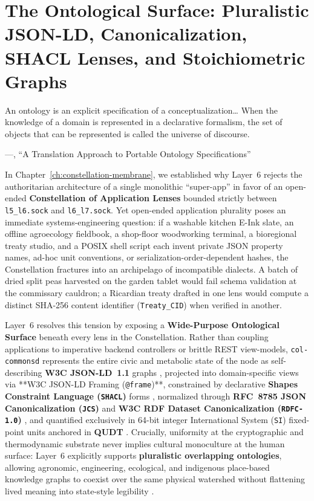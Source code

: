 \chapter{The Ontological Surface: Pluralistic JSON-LD, Canonicalization, SHACL Lenses, and Stoichiometric Graphs}
\label{ch:semantic-foundation}

\epigraph{An ontology is an explicit specification of a conceptualization\ldots{} When the knowledge of a domain is represented in a declarative formalism, the set of objects that can be represented is called the universe of discourse.}{---\textcite{gruber1993ontology}, ``A Translation Approach to Portable Ontology Specifications''}

In Chapter~\ref{ch:constellation-membrane}, we established why Layer~6 rejects the authoritarian architecture of a single monolithic ``super-app'' in favor of an open-ended \textbf{Constellation of Application Lenses} bounded strictly between \texttt{l5\_l6.sock} and \texttt{l6\_l7.sock}. Yet open-ended application plurality poses an immediate systems-engineering question: if a washable kitchen E-Ink slate, an offline agroecology fieldbook, a shop-floor woodworking terminal, a bioregional treaty studio, and a POSIX shell script each invent private JSON property names, ad-hoc unit conventions, or serialization-order-dependent hashes, the Constellation fractures into an archipelago of incompatible dialects. A batch of dried split peas harvested on the garden tablet would fail schema validation at the commissary cauldron; a Ricardian treaty drafted in one lens would compute a distinct SHA-256 content identifier (\texttt{Treaty\_CID}) when verified in another.

Layer~6 resolves this tension by exposing a \textbf{Wide-Purpose Ontological Surface} beneath every lens in the Constellation. Rather than coupling applications to imperative backend controllers or brittle REST view-models, \texttt{col-commonsd} represents the entire civic and metabolic state of the node as self-describing \textbf{W3C JSON-LD~1.1} graphs \parencite{w3c2020jsonld,bernerslee2001semantic}, projected into domain-specific views via **W3C JSON-LD Framing (\texttt{@frame})**, constrained by declarative \textbf{Shapes Constraint Language (\texttt{SHACL})} forms \parencite{w3c2017shacl}, normalized through \textbf{RFC~8785 JSON Canonicalization (\texttt{JCS})} \parencite{rfc8785} and \textbf{W3C RDF Dataset Canonicalization (\texttt{RDFC-1.0})} \parencite{w3c2024rdfc}, and quantified exclusively in 64-bit integer International System (\texttt{SI}) fixed-point units anchored in \textbf{QUDT} \parencite{qudt2024}. Crucially, uniformity at the cryptographic and thermodynamic substrate never implies cultural monoculture at the human surface: Layer~6 explicitly supports \textbf{pluralistic overlapping ontologies}, allowing agronomic, engineering, ecological, and indigenous place-based knowledge graphs to coexist over the same physical watershed without flattening lived meaning into state-style legibility \parencite{scott1998,costanzachock2020design}.

